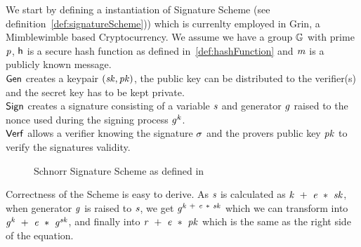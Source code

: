 We start by defining a instantiation of Signature Scheme (see definition~\ref{def:signatureScheme})) which is currenlty employed in Grin, a Mimblewimble based Cryptocurrency.
We assume we have a group $\mathbb{G}$ with prime $\mathit{p}$, $\mathsf{h}$ is a secure hash function as defined in~\ref{def:hashFunction} and $\mathit{m}$ is a publicly known message.\\
$\mathsf{\mathsf{Gen}}$ creates a keypair $(\mathit{sk}, \mathit{pk})$, the public key can be distributed to the verifier(s) and the secret key has to be kept private. \\
$\mathsf{Sign}$ creates a signature consisting of a variable $\mathit{s}$ and generator $\mathit{g}$ raised to the nonce used during the signing process $\mathit{g}^{\mathit{k}}$. \\
$\mathsf{Verf}$ allows a verifier knowing the signature $\sigma$ and the provers public key $\mathit{pk}$ to verify the signatures validity. \\
\begin{figure}
    \label{fig:schnorr}
    \fbox{
        \parbox{\textwidth}{
            \procedure[linenumbering, syntaxhighlight=auto]{$\procGen{\varSecParam}$} {
                \varKey \sample \cnstIntegersPrimeWithoutZero{\varPrime} \\
                \pcreturn (\varSecKey \opAssign \varKey \opSeperate \varPubKey \opAssign \funGen{\varKey})
            }
            \procedure[linenumbering, syntaxhighlight=auto]{$\procSign{\varMsg}{\varSecKey}$}{
                \varNonce \sample \cnstIntegersPrimeWithoutZero{\varPrime} \\
                \varRand \opAssign \funGen{\varNonce} \\
                \varSchnorrChallenge \opAssign \funHash{\varMsg \opConc \varRand \opConc \varPubKey} \\
                \varS \opAssign \varNonce \opAdd \varSchnorrChallenge \opMult \varSecKey \\
                \pcreturn \varSignature \opAssign (\varS, \varRand)
            }
            \procedure[linenumbering, syntaxhighlight=auto]{$\procVerf{\varMsg}{\varSignature}{\varPubKey}$} {
                \varS \opAssign \opAccess{\varSignature}{\varS} \\
                \varRand \opAssign \opAccess{\varSignature}{\varRand} \\
                \varSchnorrChallenge \opAssign \funHash{\varMsg \opConc \varRand \opConc \varPubKey} \\
                \pcreturn \funGen{\varS} \opEq \varRand \opAdd \varSchnorrChallenge \opMult \varPubKey
            }
        }
    }
    \caption{Schnorr Signature Scheme as defined in~\cite{schnorr1991efficient}}
\end{figure}
Correctness of the Scheme is easy to derive. As $\mathit{s}$ is calculated as $\mathit{k} ~+~ \mathit{e} ~*~ \mathit{sk}$, when generator $\mathit{g}$ is raised to $\mathit{s}$, we get
$\mathit{g}^{\mathit{k} ~+~ \mathit{e} ~*~ \mathit{sk}}$ which we can transform into $\mathit{g}^{\mathit{k}} ~+~ \mathit{e} ~*~ \mathit{g}^{\mathit{sk}}$, and finally
into $\mathit{r} ~+~ \mathit{e} ~*~ \mathit{pk}$ which is the same as the right side of the equation.

